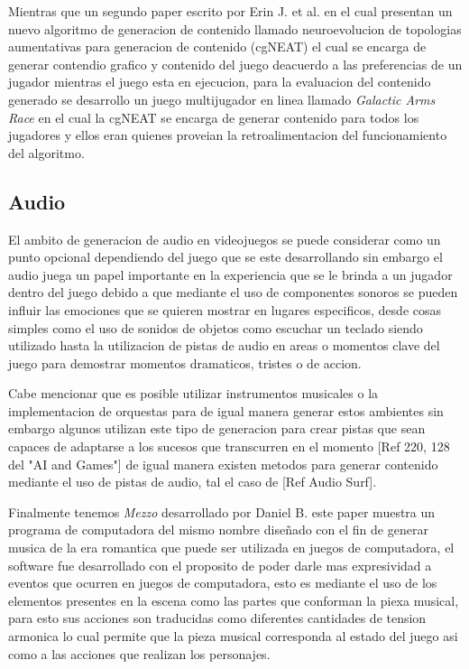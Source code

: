 Mientras que un segundo paper escrito por Erin J. et al.\cite{Hastings2009} en
el cual presentan un nuevo algoritmo de generacion de contenido llamado
neuroevolucion de topologias aumentativas para generacion de contenido (cgNEAT)
el cual se encarga de generar contendio grafico y contenido del juego deacuerdo
a las preferencias de un jugador mientras el juego esta en ejecucion, para la
evaluacion del contenido generado se desarrollo un juego multijugador en linea
llamado \textit{Galactic Arms Race} en el cual la cgNEAT se encarga de generar
contenido para todos los jugadores y ellos eran quienes proveian la
retroalimentacion del funcionamiento del algoritmo.

\subsection{Audio}
\label{subsection:Audio}

El ambito de generacion de audio en videojuegos se puede considerar como un
punto opcional dependiendo del juego que se este desarrollando sin embargo el
audio juega un papel importante en la experiencia que se le brinda a un jugador
dentro del juego debido a que mediante el uso de componentes sonoros se pueden
influir las emociones que se quieren mostrar en lugares especificos, desde cosas
simples como el uso de sonidos de objetos como escuchar un teclado siendo
utilizado hasta la utilizacion de pistas de audio en areas o momentos clave del
juego para demostrar momentos dramaticos, tristes o de accion. 

Cabe mencionar que es posible utilizar instrumentos musicales o la
implementacion de orquestas para de igual manera generar estos ambientes sin
embargo algunos utilizan este tipo de generacion para crear pistas que sean
capaces de adaptarse a los sucesos que transcurren en el momento [Ref 220, 128
del "AI and Games"] de igual manera existen metodos para generar contenido
mediante el uso de pistas de audio, tal el caso de [Ref Audio Surf].

Finalmente tenemos \textit{Mezzo} desarrollado por Daniel B. este paper muestra
un programa de computadora del mismo nombre diseñado con el fin de generar
musica de la era romantica que puede ser utilizada en juegos de computadora, el
software fue desarrollado con el proposito de poder darle mas expresividad a
eventos que ocurren en juegos de computadora, esto es mediante el uso de los
elementos presentes en la escena como las partes que conforman la piexa musical,
para esto sus acciones son traducidas como diferentes cantidades de tension
armonica lo cual permite que la pieza musical corresponda al estado del juego
asi como a las acciones que realizan los personajes.

